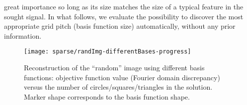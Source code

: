 great importance so long as its size matches the size of a typical
feature in the sought signal. In what follows, we evaluate the
possibility to discover the most appropriate grid pitch (basis
function size) automatically, without any prior information.
\begin{figure}[H]
  \centering
  \texttt{[image: sparse/randImg-differentBases-progress]}
  \caption[Reconstruction of the ``random'' image using different
    basis functions]{Reconstruction of the ``random'' image using different
    basis functions: objective function value (Fourier domain
    discrepancy) versus the number of circles/squares/triangles in the
    solution. Marker shape corresponds to the basis function shape.}
  \label{fig:objective-function-different-bases}
\end{figure}



